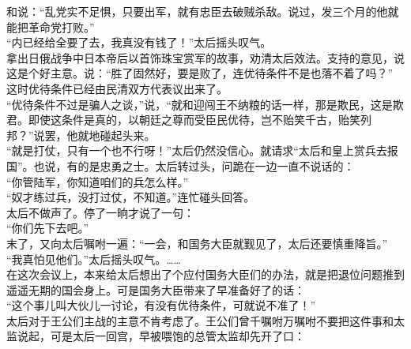 和说：“乱党实不足惧，只要出军，就有忠臣去破贼杀敌。说过，发三个月的他就能把革命党打败。”\\

“内已经给全要了去，我真没有钱了！”太后摇头叹气。\\

拿出日俄战争中日本帝后以首饰珠宝赏军的故事，劝清太后效法。支持的意见，说这是个好主意。说：“胜了固然好，要是败了，连优待条件不是也落不着了吗？”\\

这时优待条件已经由民清双方代表议出来了。\\

“优待条件不过是骗人之谈，”说，“就和迎闯王不纳粮的话一样，那是欺民，这是欺君。即使这条件是真的，以朝廷之尊而受臣民优待，岂不贻笑千古，贻笑列邦？”说罢，他就地碰起头来。\\

“就是打仗，只有一个也不行呀！”太后仍然没信心。就请求“太后和皇上赏兵去报国”。也说，有的是忠勇之士。太后转过头，问跪在一边一直不说话的：\\

“你管陆军，你知道咱们的兵怎么样。”\\

“奴才练过兵，没打过仗，不知道。”连忙碰头回答。\\

太后不做声了。停了一晌才说了一句：\\

“你们先下去吧。”\\

末了，又向太后嘱咐一遍：“一会，和国务大臣就觐见了，太后还要慎重降旨。”\\

“我真怕见他们。”太后摇头叹气。……\\

在这次会议上，本来给太后想出了个应付国务大臣们的办法，就是把退位问题推到遥遥无期的国会身上。可是国务大臣带来了早准备好了的话：\\

“这个事儿叫大伙儿一讨论，有没有优待条件，可就说不准了！”\\

太后对于王公们主战的主意不肯考虑了。王公们曾千嘱咐万嘱咐不要把这件事和太监说起，可是太后一回宫，早被喂饱的总管太监却先开了口：\\

